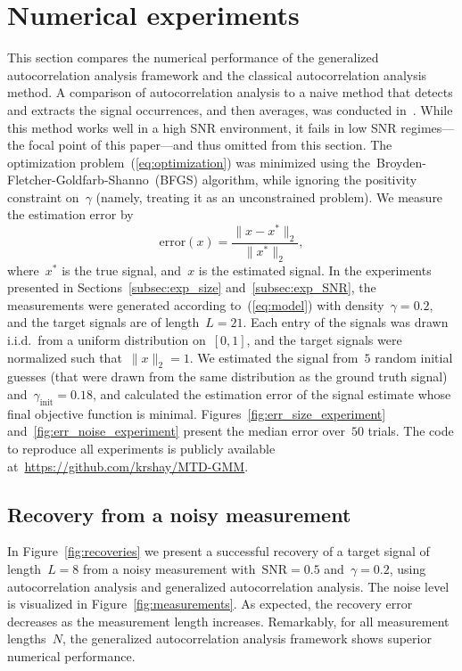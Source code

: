 \documentclass{article}
\begin{document}
\section{Numerical experiments}
\label{sec:numerical}
This section compares the numerical performance of the generalized autocorrelation analysis framework and the classical autocorrelation analysis method. A comparison of autocorrelation analysis {to a naive method that detects and extracts the signal occurrences, and then averages, was} conducted in~\cite{lan2020multi,kreymer2021two}. While this method works well in a high SNR environment, it fails in low SNR regimes---the focal point of this paper---and thus omitted from this section. The optimization problem~(\ref{eq:optimization}) was minimized using the~\mbox{Broyden-Fletcher-Goldfarb-Shanno}~(BFGS) algorithm, while ignoring the positivity constraint on~$\gamma$ (namely, treating it as an unconstrained problem).  We measure the estimation error by
\begin{equation*}
\text{error}(x) = \frac{\|x - x^*\|_2}{\|x^*\|_2},
\end{equation*}
where~$x^*$ is the true signal, and~$x$ is the estimated signal. In the experiments presented in Sections~\ref{subsec:exp_size} and~\ref{subsec:exp_SNR}, the measurements were generated according to~(\ref{eq:model}) with density~\mbox{$\gamma = 0.2$}, and the target signals are of length~\mbox{$L = 21$}. Each entry of the signals was drawn i.i.d.\ from a uniform distribution on~$[0,1]$, and the target signals were normalized such that~$\|x\|_2  =1$. We estimated the signal from~$5$ random initial guesses (that were drawn from the same distribution as the ground truth signal) and~\mbox{$\gamma_{\text{init}} = 0.18$}, and calculated the estimation error of the {signal} estimate whose final objective function is minimal. Figures~\ref{fig:err_size_experiment} and~\ref{fig:err_noise_experiment} present the median error over~$50$ trials. The code to reproduce all experiments is publicly available at~\url{https://github.com/krshay/MTD-GMM}.

\subsection{Recovery from a noisy measurement}
\label{subsec:exp_recovery}
In Figure~\ref{fig:recoveries} we present a successful recovery of a target signal of length~\mbox{$L = 8$} from a noisy measurement with~\mbox{$\text{SNR} = 0.5$} and~\mbox{$\gamma = 0.2$}, using autocorrelation analysis and generalized autocorrelation analysis. The noise level is visualized in Figure~\ref{fig:measurements}. 
As expected, the recovery error decreases  as the measurement length increases. Remarkably, for all measurement lengths~$N$, the generalized autocorrelation analysis framework shows superior numerical performance.
\end{document}
